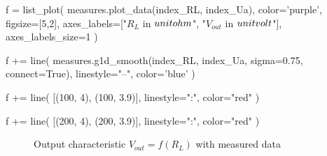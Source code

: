 \begin{sagesilent}
    f = list_plot(
        measures.plot_data(index_RL, index_Ua),
        color='purple',
        figsize=[5,2],
        axes_labels=["$R_L$ in $\\unit{\\ohm}$", "$V_{out}$ in $\\unit{\\volt}$"],
        axes_labels_size=1
    )

    f += line(
        measures.g1d_smooth(index_RL, index_Ua, sigma=0.75, connect=True),
        linestyle="--",
        color='blue'
    )

    f += line(
        [(100, 4), (100, 3.9)],
        linestyle=":",
        color="red"
    )

    f += line(
        [(200, 4), (200, 3.9)],
        linestyle=":",
        color="red"
    )
\end{sagesilent}

\begin{figure}[H]
    \centering
    \caption{Output characteristic \textbf{$V_{out} = f(R_L)$} with measured data}
\end{figure}